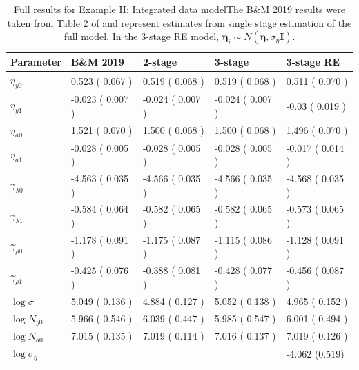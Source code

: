 \documentclass[12pt]{article}
\newcommand{\bn}{\boldsymbol{\eta}}
\newcommand{\bI}{\mathbf{I}}
\begin{document}
\begin{table}[!h]
\caption{Full results for Example II: Integrated data modelThe B\&M 2019 results were taken from Table 2 of \citet{besbeas2019exact} and represent estimates from single stage estimation of the full model. In the 3-stage RE model, $\bn_i \sim N(\bn,\sigma_{\eta}\bI)$.} \medskip
\begin{tabular}{lllll}
\hline \hline
Parameter & B\&M 2019 & 2-stage & 3-stage & 3-stage RE\\
\hline
$\eta_{y0}$ & 0.523  ( 0.067 ) & 0.519  ( 0.068 ) & 0.519  ( 0.068 ) & 0.511  ( 0.070 )\\
$\eta_{y1}$ & -0.023  ( 0.007 ) & -0.024  ( 0.007 ) & -0.024  ( 0.007 ) & -0.03  ( 0.019 )\\
$\eta_{a0}$ & 1.521  ( 0.070 ) & 1.500  ( 0.068 ) & 1.500  ( 0.068 ) & 1.496  ( 0.070 )\\
$\eta_{a1}$ & -0.028  ( 0.005 ) & -0.028  ( 0.005 ) & -0.028  ( 0.005 ) & -0.017  ( 0.014 ) \bigskip\\
$\gamma_{\lambda 0}$ & -4.563  ( 0.035 ) & -4.566  ( 0.035 ) & -4.566  ( 0.035 ) & -4.568  ( 0.035 )\\
$\gamma_{\lambda 1}$ & -0.584  ( 0.064 ) & -0.582  ( 0.065 ) & -0.582  ( 0.065 ) & -0.573  ( 0.065 )\\
$\gamma_{\rho 0}$ & -1.178  ( 0.091 ) & -1.175  ( 0.087 ) & -1.115  ( 0.086 ) & -1.128  ( 0.091 )\\
$\gamma_{\rho 1}$ & -0.425  ( 0.076 ) & -0.388  ( 0.081 ) & -0.428  ( 0.077 ) & -0.456  ( 0.087 ) \bigskip \\
$\log \sigma$ & 5.049  ( 0.136 ) & 4.884  ( 0.127 ) & 5.052  ( 0.138 ) & 4.965  ( 0.152 )\\
$\log N_{y0}$ & 5.966  ( 0.546 ) & 6.039  ( 0.447 ) & 5.985  ( 0.547 ) & 6.001  ( 0.494 )\\
$\log N_{a0}$ & 7.015  ( 0.135 ) & 7.019  ( 0.114 ) & 7.016  ( 0.137 ) & 7.019  ( 0.126 )\\
$\log \sigma_\eta$&  & & & -4.062 (0.519)\\
\hline
\end{tabular}
\end{table}
\end{document}

